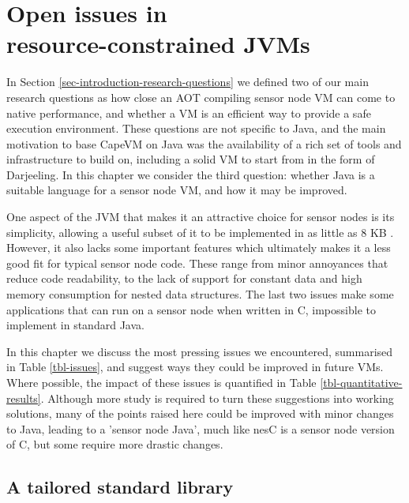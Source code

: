 \chapter[Open issues in resource-constrained JVMs]{Open issues in \\ resource-constrained JVMs}



\label{sec-lessons-from-jvm}

In Section \ref{sec-introduction-research-questions} we defined two of our main research questions as how close an AOT compiling sensor node VM can come to native performance, and whether a VM is an efficient way to provide a safe execution environment. These questions are not specific to Java, and the main motivation to base CapeVM on Java was the availability of a rich set of tools and infrastructure to build on, including a solid VM to start from in the form of Darjeeling. In this chapter we consider the third question: whether Java is a suitable language for a sensor node VM, and how it may be improved.

One aspect of the JVM that makes it an attractive choice for sensor nodes is its simplicity, allowing a useful subset of it to be implemented in as little as 8 KB \cite{Harbaum}. However, it also lacks some important features which ultimately makes it a less good fit for typical sensor node code. These range from minor annoyances that reduce code readability, to the lack of support for constant data and high memory consumption for nested data structures. The last two issues make some applications that can run on a sensor node when written in C, impossible to implement in standard Java.

In this chapter we discuss the most pressing issues we encountered, summarised in Table \ref{tbl-issues}, and suggest ways they could be improved in future VMs. Where possible, the impact of these issues is quantified in Table \ref{tbl-quantitative-results}. Although more study is required to turn these suggestions into working solutions, many of the points raised here could be improved with minor changes to Java, leading to a 'sensor node Java', much like nesC \cite{Gay:2003up} is a sensor node version of C, but some require more drastic changes.




\section{A tailored standard library}
\label{sec-std-lib}

